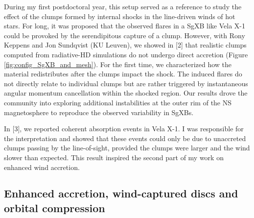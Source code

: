 \documentclass[12pt,onecolumn]{article}
\makeatletter
\newcommand{\sgx}{SgXB\xspace}
\newcommand{\sgxs}{SgXBs\xspace}
\newcommand*{\ns}{NS\@\xspace}
\makeatother
\begin{document}
During my first postdoctoral year, this setup served as a reference to study the effect of the clumps formed by internal shocks in the line-driven winds of hot stars. For long, it was proposed that the observed flares in a \sgx like Vela X-1 could be provoked by the serendipitous capture of a clump. However, with Rony Keppens and Jon Sundqvist (KU Leuven), we showed in [2] that realistic clumps computed from radiative-HD simulations do not undergo direct accretion (Figure\,\,\ref{fig:config_SgXB_and_mesh}). For the first time, we characterized how the material redistributes after the clumps impact the shock. The induced flares do not directly relate to individual clumps but are rather triggered by instantaneous angular momentum cancellation within the shocked region. Our results drove the community into exploring additional instabilities at the outer rim of the \ns magnetosphere to reproduce the observed variability in \sgxs.

In [3], we reported coherent absorption events in Vela X-1. I was responsible for the interpretation and showed that these events could only be due to unaccreted clumps passing by the line-of-sight, provided the clumps were larger and the wind slower than expected. This result inspired the second part of my work on enhanced wind accretion.





\newpage

\subsection*{Enhanced accretion, wind-captured discs and orbital compression}
\end{document}
